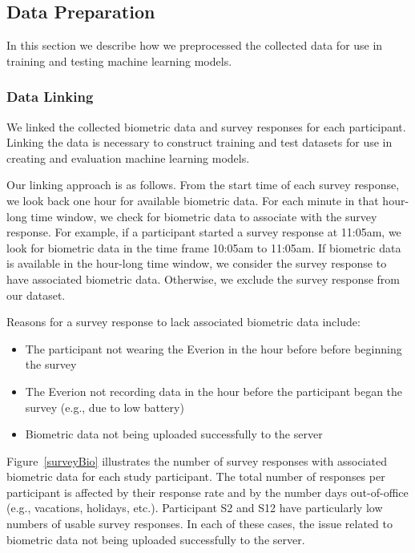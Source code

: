 \subsection{Data Preparation}

In this section we describe how we preprocessed the collected data for use in training and testing machine learning models.

\subsubsection{Data Linking}

We linked the collected biometric data and survey responses for each participant. Linking the data is necessary to construct training and test datasets for use in creating and evaluation machine learning models.

Our linking approach is as follows. From the start time of each survey response, we look back one hour for available biometric data. For each minute in that hour-long time window, we check for biometric data to associate with the survey response. For example, if a participant started a survey response at 11:05am, we look for biometric data in the time frame 10:05am to 11:05am. If biometric data is available in the hour-long time window, we consider the survey response to have associated biometric data. Otherwise, we exclude the survey response from our dataset.

Reasons for a survey response to lack associated biometric data include:
\begin{itemize}
\item The participant not wearing the Everion in the hour before before beginning the survey
\item The Everion not recording data in the hour before the participant began the survey (e.g., due to low battery)
\item Biometric data not being uploaded successfully to the server
\end{itemize}

Figure~\ref{surveyBio} illustrates the number of survey responses with associated biometric data for each study participant. 
The total number of responses per participant is affected by their response rate and by the number days out-of-office (e.g., vacations, holidays, etc.). 
Participant S2 and S12 have particularly low numbers of usable survey responses. In each of these cases, the issue related to biometric data not being uploaded successfully to the server.


